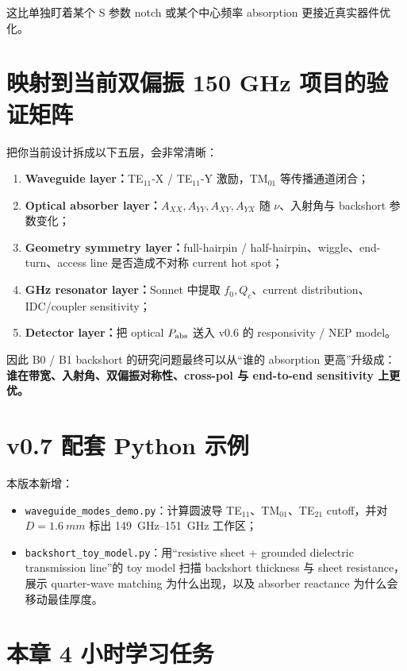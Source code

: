 \documentclass[11pt,a4paper,openany]{ctexrep}
\begin{document}
这比单独盯着某个 S 参数 notch 或某个中心频率 absorption 更接近真实器件优化。

\section{映射到当前双偏振 150 GHz 项目的验证矩阵}

\begin{projectbox}
把你当前设计拆成以下五层，会非常清晰：
\begin{enumerate}
  \item \textbf{Waveguide layer：}TE$_{11}$-X / TE$_{11}$-Y 激励，TM$_{01}$ 等传播通道闭合；
  \item \textbf{Optical absorber layer：}$A_{XX},A_{YY},A_{XY},A_{YX}$ 随 $\nu$、入射角与 backshort 参数变化；
  \item \textbf{Geometry symmetry layer：}full-hairpin / half-hairpin、wiggle、end-turn、access line 是否造成不对称 current hot spot；
  \item \textbf{GHz resonator layer：}Sonnet 中提取 $f_0,Q_c$、current distribution、IDC/coupler sensitivity；
  \item \textbf{Detector layer：}把 optical $P_{\rm abs}$ 送入 v0.6 的 responsivity / NEP model。
\end{enumerate}
因此 B0 / B1 backshort 的研究问题最终可以从“谁的 absorption 更高”升级成：\textbf{谁在带宽、入射角、双偏振对称性、cross-pol 与 end-to-end sensitivity 上更优。}
\end{projectbox}

\section{v0.7 配套 Python 示例}

本版本新增：
\begin{itemize}
  \item \texttt{waveguide\_modes\_demo.py}：计算圆波导 TE$_{11}$、TM$_{01}$、TE$_{21}$ cutoff，并对 $D=\SI{1.6}{mm}$ 标出 \SIrange{149}{151}{GHz} 工作区；
  \item \texttt{backshort\_toy\_model.py}：用“resistive sheet + grounded dielectric transmission line”的 toy model 扫描 backshort thickness 与 sheet resistance，展示 quarter-wave matching 为什么出现，以及 absorber reactance 为什么会移动最佳厚度。
\end{itemize}

\section{本章 4 小时学习任务}
\end{document}
